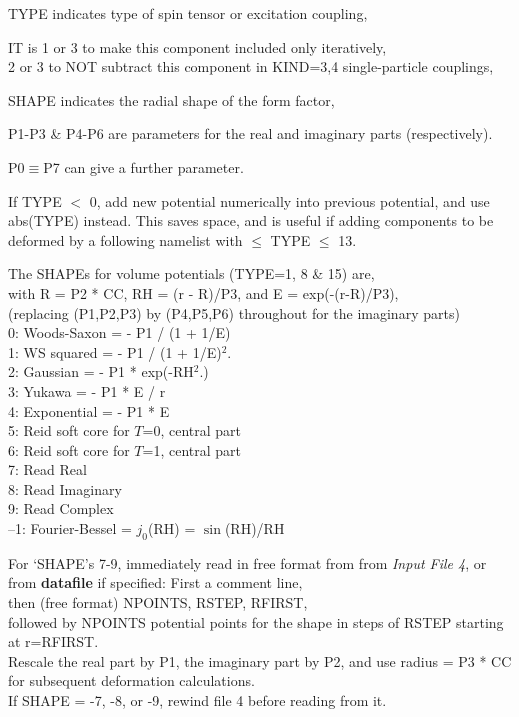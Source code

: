 \documentclass[11pt]{article}
\begin{document}
%

\noindent
TYPE indicates type of spin tensor or excitation coupling,

\noindent
IT is 1 or 3 to make this component included only iteratively,\\
 \hspace*{8mm} 2 or 3 to NOT subtract this component in KIND=3,4 single-particle  couplings,

\noindent
SHAPE indicates the radial shape of the form factor,

\noindent
P1-P3 \& P4-P6  are parameters for the real and imaginary parts (respectively).

\noindent
P0$\equiv$P7 can give a further parameter.

\medskip

If TYPE $<$ 0, add new potential numerically into previous potential,
and use abs(TYPE) instead.   This saves space, and is useful if adding
 components to be deformed by a following namelist with $\leq$ TYPE $\leq$ 13.


\bigskip

The SHAPEs for volume potentials (TYPE=1, 8 \& 15) are,
\\
with R = P2 * CC, RH = (r - R)/P3, and E = exp(-(r-R)/P3),
\\
(replacing (P1,P2,P3) by (P4,P5,P6) throughout for the imaginary parts)\\
%
   0: Woods-Saxon  = - P1 / (1 + 1/E)
\\ 1: WS squared   = - P1 / (1 + 1/E)$^2$.
\\ 2: Gaussian     = - P1 * exp(-RH$^2$.)
\\ 3: Yukawa       = - P1 * E / r
\\ 4: Exponential  = - P1 * E
\\ 5: Reid soft core for $T$=0, central part
\\ 6: Reid soft core for $T$=1, central part
\\ 7: Read Real
\\ 8: Read Imaginary
\\ 9: Read Complex
\\--1: Fourier-Bessel = $j_0$(RH) = $\sin$(RH)/RH


For `SHAPE's 7-9, immediately read in free format from from {\em Input File 4}, or from {\bf datafile} if specified:
First a comment line,\\
then (free format) NPOINTS, RSTEP, RFIRST, \\
followed by NPOINTS potential points for the shape in steps of RSTEP starting at r=RFIRST.
\\
Rescale the real part by P1, the imaginary part by P2,
and use radius = P3 * CC for subsequent deformation calculations.
\\
If SHAPE = -7, -8, or -9, rewind file 4 before reading from it.
\bigskip
\end{document}
